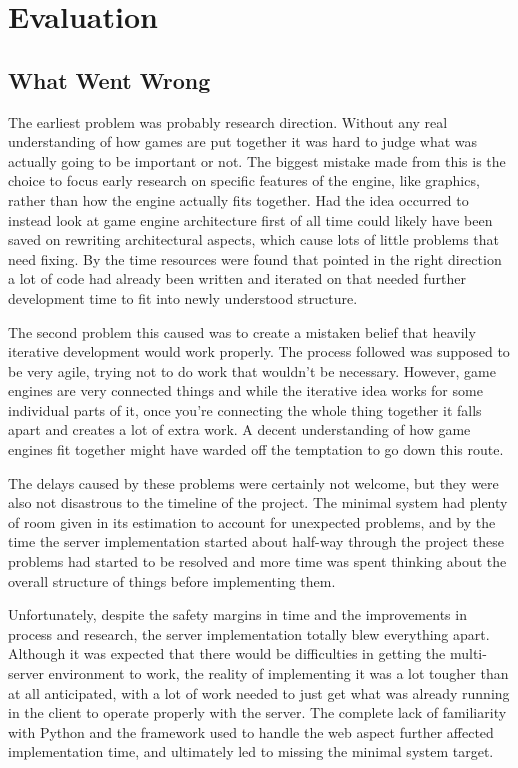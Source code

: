\chapter{Evaluation}

\section{What Went Wrong}
The earliest problem was probably research direction. Without any real understanding of how games are put together it was hard to judge what was actually going to be important or not. The biggest mistake made from this is the choice to focus early research on specific features of the engine, like graphics, rather than how the engine actually fits together. Had the idea occurred to instead look at game engine architecture first of all time could likely have been saved on rewriting architectural aspects, which cause lots of little problems that need fixing. By the time resources were found that pointed in the right direction a lot of code had already been written and iterated on that needed further development time to fit into newly understood structure.

The second problem this caused was to create a mistaken belief that heavily iterative development would work properly. The process followed was supposed to be very agile, trying not to do work that wouldn't be necessary. However, game engines are very connected things and while the iterative idea works for some individual parts of it, once you're connecting the whole thing together it falls apart and creates a lot of extra work. A decent understanding of how game engines fit together might have warded off the temptation to go down this route.

The delays caused by these problems were certainly not welcome, but they were also not disastrous to the timeline of the project. The minimal system had plenty of room given in its estimation to account for unexpected problems, and by the time the server implementation started about half-way through the project these problems had started to be resolved and more time was spent thinking about the overall structure of things before implementing them.

Unfortunately, despite the safety margins in time and the improvements in process and research, the server implementation totally blew everything apart. Although it was expected that there would be difficulties in getting the multi-server environment to work, the reality of implementing it was a lot tougher than at all anticipated, with a lot of work needed to just get what was already running in the client to operate properly with the server. The complete lack of familiarity with Python and the framework used to handle the web aspect further affected implementation time, and ultimately led to missing the minimal system target.

